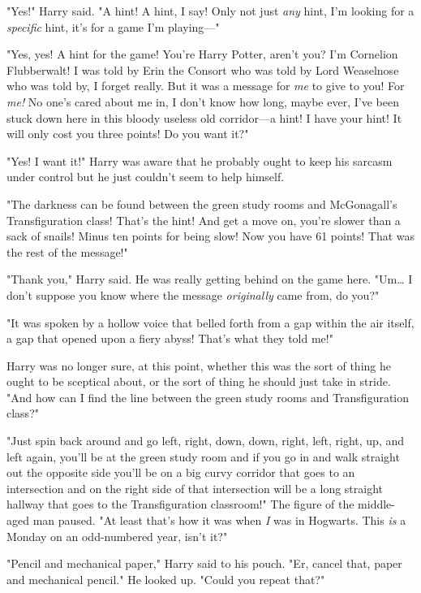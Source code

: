 "Yes!" Harry said. "A hint! A hint, I say! Only not just \emph{any} hint, I'm 
looking for a \emph{specific} hint, it's for a game I'm playing---"

"Yes, yes! A hint for the game! You're Harry Potter, aren't you? I'm Cornelion 
Flubberwalt! I was told by Erin the Consort who was told by Lord Weaselnose who 
was told by, I forget really. But it was a message for \emph{me} to give to 
you! For \emph{me!} No one's cared about me in, I don't know how long, maybe 
ever, I've been stuck down here in this bloody useless old corridor---a hint! I 
have your hint! It will only cost you three points! Do you want it?"

"Yes! I want it!" Harry was aware that he probably ought to keep his sarcasm 
under control but he just couldn't seem to help himself.

"The darkness can be found between the green study rooms and McGonagall's 
Transfiguration class! That's the hint! And get a move on, you're slower than a 
sack of snails! Minus ten points for being slow! Now you have 61 points! That 
was the rest of the message!"

"Thank you," Harry said. He was really getting behind on the game here. 
"Um{\ldots} I don't suppose you know where the message \emph{originally} came 
from, do you?"

"It was spoken by a hollow voice that belled forth from a gap within the air 
itself, a gap that opened upon a fiery abyss! That's what they told me!"

Harry was no longer sure, at this point, whether this was the sort of thing he 
ought to be sceptical about, or the sort of thing he should just take in 
stride. "And how can I find the line between the green study rooms and 
Transfiguration class?"

"Just spin back around and go left, right, down, down, right, left, right, up, 
and left again, you'll be at the green study room and if you go in and walk 
straight out the opposite side you'll be on a big curvy corridor that goes to 
an intersection and on the right side of that intersection will be a long 
straight hallway that goes to the Transfiguration classroom!" The figure of the 
middle-aged man paused. "At least that's how it was when \emph{I} was in 
Hogwarts. This \emph{is} a Monday on an odd-numbered year, isn't it?"

"Pencil and mechanical paper," Harry said to his pouch. "Er, cancel that, paper 
and mechanical pencil." He looked up. "Could you repeat that?"

